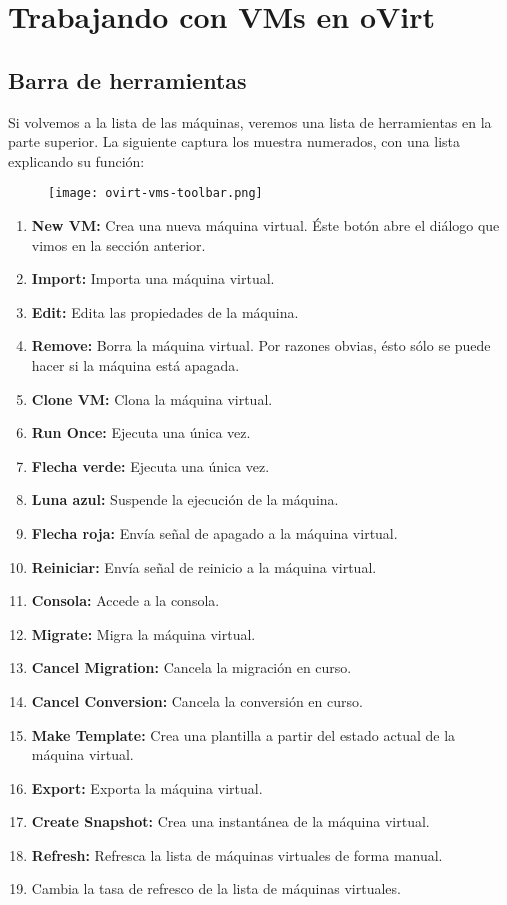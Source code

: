 \chapter{Trabajando con VMs en oVirt}
\label{ch:trabajando}

\section{Barra de herramientas}
\label{sec:controles}

Si volvemos a la lista de las máquinas, veremos una lista de herramientas en la parte superior. La siguiente captura los muestra numerados, con una lista explicando su función:

\begin{figure}[ht]
  \centering
  \texttt{[image: ovirt-vms-toolbar.png]}
\end{figure}

\begin{enumerate}
\item \textbf{New VM:} Crea una nueva máquina virtual. Éste botón abre el diálogo que vimos en la sección anterior.
\item \textbf{Import:} Importa una máquina virtual.
\item \textbf{Edit:} Edita las propiedades de la máquina.
\item \textbf{Remove:} Borra la máquina virtual. Por razones obvias, ésto sólo se puede hacer si la máquina está apagada.
\item \textbf{Clone VM:} Clona la máquina virtual.
\item \textbf{Run Once:} Ejecuta una única vez.
\item \textbf{Flecha verde:} Ejecuta una única vez.
\item \textbf{Luna azul:} Suspende la ejecución de la máquina.
\item \textbf{Flecha roja:} Envía señal de apagado a la máquina virtual.
\item \textbf{Reiniciar:} Envía señal de reinicio a la máquina virtual.
\item \textbf{Consola:} Accede a la consola.
\item \textbf{Migrate:} Migra la máquina virtual.
\item \textbf{Cancel Migration:} Cancela la migración en curso.
\item \textbf{Cancel Conversion:} Cancela la conversión en curso.
\item \textbf{Make Template:} Crea una plantilla a partir del estado actual de la máquina virtual.
\item \textbf{Export:} Exporta la máquina virtual.
\item \textbf{Create Snapshot:} Crea una instantánea de la máquina virtual.
\item \textbf{Refresh:} Refresca la lista de máquinas virtuales de forma manual.
\item Cambia la tasa de refresco de la lista de máquinas virtuales.
\end{enumerate}

